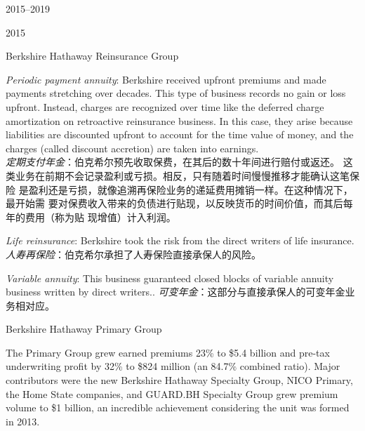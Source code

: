 \begin{chapter}{2015--2019}
\begin{section}{2015}
\begin{subsection}{Berkshire Hathaway Reinsurance Group}
{\color{green}{此处应为列表项 \\}}

\begin{verseparallel}
  {
    \textit{Periodic payment annuity}: Berkshire received upfront premiums and
    made payments stretching over decades. This type of business records
    no gain or loss upfront. Instead, charges are recognized over time like
    the deferred charge amortization on retroactive reinsurance business.
    In this case, they arise because liabilities are discounted upfront to
    account for the time value of money, and the charges (called discount
    accretion) are taken into earnings. \\
  }
  {
    \textit{定期支付年金}：伯克希尔预先收取保费，在其后的数十年间进行赔付或返还。
    这类业务在前期不会记录盈利或亏损。相反，只有随着时间慢慢推移才能确认这笔保险
    是盈利还是亏损，就像追溯再保险业务的递延费用摊销一样。在这种情况下，最开始需
    要对保费收入带来的负债进行贴现，以反映货币的时间价值，而其后每年的费用（称为贴
    现增值）计入利润。
  }
\end{verseparallel}

\begin{verseparallel}
  {
    \textit{Life reinsurance}: Berkshire took the risk from the direct writers of
    life insurance. \\
  }
  {
    \textit{人寿再保险}：伯克希尔承担了人寿保险直接承保人的风险。
  }
\end{verseparallel}

\begin{verseparallel}
  {
    \textit{Variable annuity}: This business guaranteed closed blocks of
    variable annuity business written by direct writers..
  }
  {
    \textit{可变年金}：这部分与直接承保人的可变年金业务相对应。
  }
\end{verseparallel}

\end{subsection}

\begin{subsection}{Berkshire Hathaway Primary Group}
\begin{verseparallel}
  {

    The Primary Group grew earned premiums 23\% to \$5.4 billion and pre-tax
    underwriting profit by 32\% to \$824 million (an 84.7\% combined ratio).
    Major contributors were the new Berkshire Hathaway Specialty Group, NICO
    Primary, the Home State companies, and GUARD.\@ BH Specialty Group grew
    premium volume to \$1 billion, an incredible achievement considering the unit
    was formed in 2013.

}
\end{verseparallel}
\end{subsection}
\end{section}
\end{chapter}
